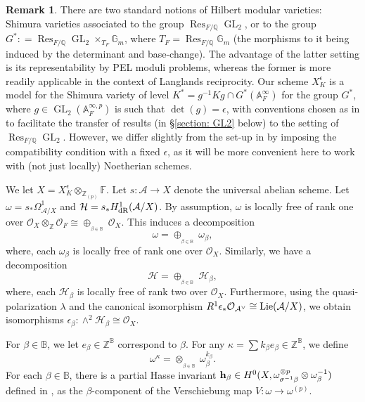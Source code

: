 \documentclass[11pt,pdflatex]{amsart}
\theoremstyle{plain}
\theoremstyle{definition}
\newtheorem{remark}[theorem]{Remark}
\newcommand{\FF}{\mathbf{F}}
\newcommand{\QQ}{\mathbf{Q}}
\newcommand{\ZZ}{\mathbf{Z}}
\newcommand{\CO}{\mathcal{O}}
\theoremstyle{plain}
\theoremstyle{definition}
\theoremstyle{remark}
\numberwithin{equation}{section}
\numberwithin{figure}{section} \numberwithin{table}{subsection}
\newcommand{\Res}{{\operatorname{Res }}}
\newcommand{\GL}{{\operatorname{GL}}}
\newcommand{\calA}{{\mathcal{A}}}
\newcommand{\calH}{{\mathcal{H}}}
\newcommand{\calO}{{\mathcal{O}}}
\def\AA{\mathbb{A}}
\def\BB{\mathbb{B}}
\def\FF{\mathbb{F}}
\def\GG{\mathbb{G}}
\def\QQ{\mathbb{Q}}
\def\ZZ{\mathbb{Z}}
\begin{document}
\begin{remark} There are two standard notions of Hilbert modular varieties: Shimura varieties associated to the group $\Res_{F/\QQ}\GL_2$, or to the group $G^*: = \Res_{F/\QQ}\GL_2 \times_{T_F} \GG_m$, where $T_F = \Res_{F/\QQ}\GG_m$ (the morphisms to it being induced by the determinant and base-change).  The advantage of the latter setting is its representability by PEL moduli problems, whereas the former is more readily applicable in the context of Langlands reciprocity. Our scheme $X_K^{\epsilon}$ is a model for the Shimura variety of level $K^* = g^{-1}Kg \cap G^*(\AA_F^\infty)$ for the group $G^*$, where $g \in \GL_2(\AA_F^{\infty,p})$ is such that $\det(g) = \epsilon$, with conventions chosen as in \cite{DKS} to facilitate the transfer of results (in \S\ref{section: GL2} below) to the setting of $\Res_{F/\QQ}\GL_2$.  However, we differ slightly from the set-up in \cite{DKS} by imposing the compatibility condition with a fixed $\epsilon$, as it will be more convenient here to work with (not just locally) Noetherian schemes.
\end{remark}

We let $X=X_K^\epsilon \otimes_{\ZZ_{(p)}} \FF$. Let $s:\calA \rightarrow X$ denote the universal abelian scheme. Let $\omega= s_*\Omega^1_{\calA/X}$ and $\calH=s_*H^1_{\rm dR}(\calA/X)$.
By assumption,   $\omega$ is locally free of rank one over  $\calO_{X} \otimes_\ZZ \calO_F \cong \oplus_{_{\beta\in \BB}}\  \CO_{X}$.
This induces a decomposition
\[
\omega=\oplus_{_{\beta\in \BB}}\  \omega_{\beta},
\]
where, each $\omega_\beta$ is locally free of rank one over $\calO_{X}$.
Similarly, we have a decomposition
\[
\calH =\oplus_{_{\beta\in \BB}}\  \calH_{\beta},
\]
where, each  $\calH_\beta$ is locally free of rank two over $\calO_{X}$.  Furthermore, using the quasi-polarization $\lambda$ and the canonical isomorphism $R^1\epsilon_*\CO_{\calA^\vee} \cong{\rm Lie}(\calA/X)$, we obtain isomorphisms $\epsilon_\beta: \wedge^2 \calH_\beta \cong \calO_{X}$.




 For $\beta \in \BB$, we let $e_\beta \in \ZZ^\BB$ correspond to $\beta$. For any $\kappa = \sum k_\beta e_\beta \in \ZZ^\BB$, we define
\[
\omega^\kappa=\otimes_{_{\beta \in \BB}}\  \omega_\beta^{k_\beta}.
\]
For each $\beta \in \BB$, there is a partial Hasse invariant ${\bf h}_\beta \in H^0(X,\omega_{\sigma^{-1}\beta}^{\otimes p}\otimes \omega_\beta^{-1})$ defined in \cite{AG}, as the $\beta$-component of the Verschiebung map $V:\omega \rightarrow \omega^{(p)}$.
\end{document}
